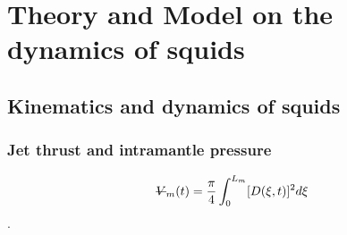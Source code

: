 \documentclass[main.tex]{subfiles}
\begin{document}
\section{Theory and Model on the dynamics of squids}

\lipsum[1]

\subsection{Kinematics and dynamics of squids}

\lipsum[1-2]

\subsubsection*{Jet thrust and intramantle pressure}

\lipsum[1-2]
\begin{equation}
    \text{\sout{$V$}}_m(t) = \frac{\pi}{4}\int_0^{L_m}[D(\xi,t)]^2d\xi
\end{equation}
\lipsum[1]\cite{Anderson2000}. 
\end{document}
